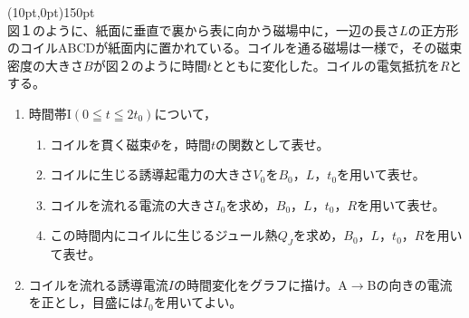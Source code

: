 \hakosyokika
\item
    \begin{mawarikomi}(10pt,0pt){150pt}{
        \hfill\hfill~\\
        
    }
    図１のように、紙面に垂直で裏から表に向かう磁場中に，一辺の長さ$L$の正方形のコイルABCDが紙面内に置かれている。コイルを通る磁場は一様で，その磁束密度の大きさ$B$が図２のように時間$t$とともに変化した。コイルの電気抵抗を$R$とする。
        \begin{enumerate}
            \item 時間帯I$(0\leqq t \leqq 2t_0)$について，
                \begin{enumerate}[(ア)]
                    \item コイルを貫く磁束$\varPhi$を，時間$t$の関数として表せ。
                    \item コイルに生じる誘導起電力の大きさ$V_0$を$B_0$，$L$，$t_0$を用いて表せ。
                    \item コイルを流れる電流の大きさ$I_0$を求め，$B_0$，$L$，$t_0$，$R$を用いて表せ。
                    \item この時間内にコイルに生じるジュール熱$Q_J$を求め，$B_0$，$L$，$t_0$，$R$を用いて表せ。
                \end{enumerate}
            \item コイルを流れる誘導電流$I$の時間変化をグラフに描け。A$\rightarrow$Bの向きの電流を正とし，目盛には$I_0$を用いてよい。
        \end{enumerate}
    \end{mawarikomi}